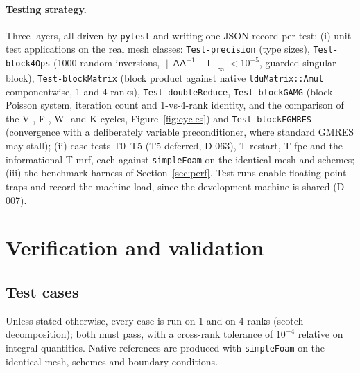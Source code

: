 \documentclass[11pt,a4paper]{article}
\newcommand{\code}[1]{\texttt{#1}}
\begin{document}
\paragraph{Testing strategy.} Three layers, all driven by \code{pytest} and
writing one JSON record per test:
(i) unit-test applications on the real mesh classes:
\code{Test-precision} (type sizes), \code{Test-block4Ops} (1000 random
inversions, $\|\mathsf A\mathsf A^{-1}-\mathsf I\|_\infty<10^{-5}$, guarded
singular block), \code{Test-blockMatrix} (block product against native
\code{lduMatrix::Amul} componentwise, 1 and 4 ranks),
\code{Test-doubleReduce}, \code{Test-blockGAMG} (block Poisson system,
iteration count and 1-vs-4-rank identity, and the comparison of the V-, F-,
W- and K-cycles, Figure~\ref{fig:cycles}) and \code{Test-blockFGMRES}
(convergence with a deliberately variable preconditioner, where standard
GMRES may stall);
(ii) case tests T0--T5 (T5 deferred, D-063), T-restart, T-fpe and the informational T-mrf, each
against \code{simpleFoam} on the identical mesh and schemes;
(iii) the benchmark harness of Section~\ref{sec:perf}. Test runs enable
floating-point traps and record the machine load, since the development
machine is shared (D-007).

\section{Verification and validation}\label{sec:vv}

\subsection{Test cases}

Unless stated otherwise, every case is run on 1 and on 4 ranks (scotch
decomposition); both must pass, with a cross-rank tolerance of $10^{-4}$
relative on integral quantities. Native references are produced with
\code{simpleFoam} on the identical mesh, schemes and boundary conditions.
\end{document}
